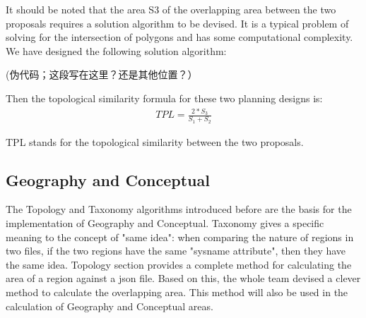 It should be noted that the area S3 of the overlapping area between the two proposals requires a solution algorithm to be devised. It is a typical problem of solving for the intersection of polygons and has some computational complexity. We have designed the following solution algorithm:

(伪代码；这段写在这里？还是其他位置？）

Then the topological similarity formula for these two planning designs is:
\begin{equation}
\begin{split}
TPL=\frac{2*S_{3} }{S_{1}+S_{2}  } 
\end{split}
\end{equation}

TPL stands for the topological similarity between the two proposals. 

\subsection*{Geography and Conceptual}
The Topology and Taxonomy algorithms introduced before are the basis for the implementation of Geography and Conceptual. Taxonomy gives a specific meaning to the concept of "same idea": when comparing the nature of regions in two files, if the two regions have the same "sysname attribute", then they have the same idea. Topology section provides a complete method for calculating the area of a region against a json file. Based on this, the whole team devised a clever method to calculate the overlapping area. This method will also be used in the calculation of Geography and Conceptual areas.

